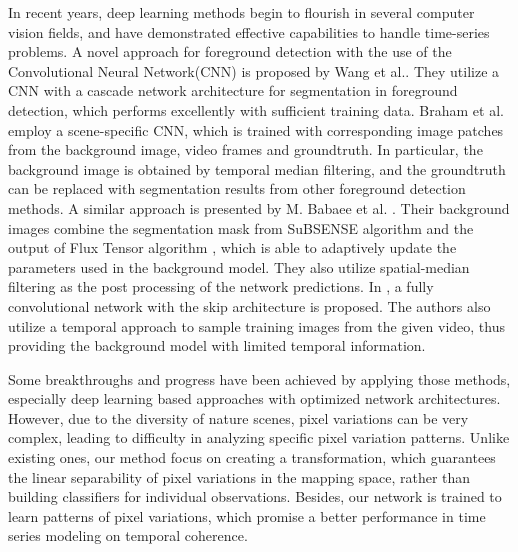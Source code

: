 \documentclass[journal]{IEEEtran}
\begin{document}
%
In recent years, deep learning methods begin to flourish in several computer vision fields, and have demonstrated effective capabilities to handle time-series problems\cite{Mobahi2009}\cite{LANGKVIST201411}. A novel approach for foreground detection with the use of the Convolutional Neural Network(CNN) is proposed by Wang et al.\cite{wang2016PRL}.
They utilize a CNN with a cascade network architecture for segmentation in foreground detection, which performs excellently with sufficient training data.
%
Braham et al. \cite{Braham2016deep} employ a scene-specific CNN, which is trained with corresponding image patches from the background image, video frames and groundtruth. In particular, the background image is obtained by temporal median filtering, and the groundtruth can be replaced with segmentation results from other foreground detection methods.
A similar approach is presented by M. Babaee et al. \cite{Babaee2017deep}. Their background images combine the segmentation mask from SuBSENSE\cite{St-Charles2015SuBSENSE} algorithm and the output of Flux Tensor algorithm \cite{Wang2014FTSG}, which is able to adaptively update the parameters used in the background model. They also utilize spatial-median filtering as the post processing of the network predictions.
In \cite{Yang2018DBMF}, a fully convolutional network with the skip architecture is proposed. 
The authors also utilize a temporal approach to sample training images from the given video, thus providing the background model with limited temporal information. 

Some breakthroughs and progress have been achieved by applying those methods, especially deep learning based approaches with optimized network architectures. 
However, due to the diversity of nature scenes, pixel variations can be very complex, leading to difficulty in analyzing specific pixel variation patterns.
Unlike existing ones, our method focus on creating a transformation, which guarantees the linear separability of pixel variations in the mapping space, rather than building classifiers for individual observations.
%
Besides, our network is trained to learn patterns of pixel variations, which promise a better performance in time series modeling on temporal coherence.
%
\end{document}
